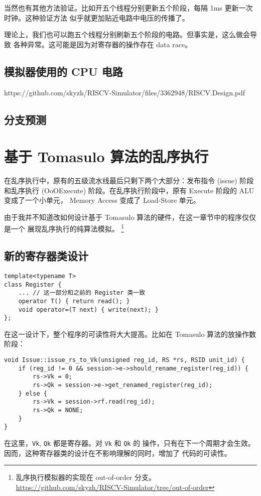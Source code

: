 \documentclass[12pt]{article}
\begin{document}
    当然也有其他方法验证。比如开五个线程分别更新五个阶段，每隔 1ms 更新一次时钟。这种验证方法
    似乎就更加贴近电路中电压的传播了。

    \begin{tcolorbox}
        理论上，我们也可以跑五个线程分别刷新五个阶段的电路。但事实是，这么做会导致
        各种异常。这可能是因为对寄存器的操作存在 data race。
    \end{tcolorbox}

    \subsection{模拟器使用的 CPU 电路}
    https://github.com/skyzh/RISCV-Simulator/files/3362948/RISCV.Design.pdf
    
    \subsection{分支预测}

    \section{基于 Tomasulo 算法的乱序执行}\label{out_of_order_execution}

    在乱序执行中，原有的五级流水线最后只剩下两个大部分：发布指令 (issue) 阶段和乱序执行
    (OoOExecute) 阶段。在乱序执行阶段中，原有 Execute 阶段的 ALU 变成了一个小单元，
    Memory Access 变成了 Load-Store 单元。

    由于我并不知道改如何设计基于 Tomasulo 算法的硬件，在这一章节中的程序仅仅是一个
    展现乱序执行的纯算法模拟。
    \footnote{乱序执行模拟器的实现在 out-of-order 分支。
        \url{https://github.com/skyzh/RISCV-Simulator/tree/out-of-order}}

    \subsection{新的寄存器类设计}\label{new_register_design}

    \begin{verbatim}
template<typename T>
class Register {
    ... // 这一部分和之前的 Register 类一致
    operator T() { return read(); }
    void operator=(T next) { write(next); }
};
    \end{verbatim}

    在这一设计下，整个程序的可读性将大大提高。比如在 Tomasulo 算法的放操作数阶段：

    \begin{verbatim}
void Issue::issue_rs_to_Vk(unsigned reg_id, RS *rs, RSID unit_id) {
    if (reg_id != 0 && session->e->should_rename_register(reg_id)) {
        rs->Vk = 0;
        rs->Qk = session->e->get_renamed_register(reg_id);
    } else {
        rs->Vk = session->rf.read(reg_id);
        rs->Qk = NONE;
    }
}
    \end{verbatim}

    在这里，\texttt{Vk}, \texttt{Qk} 都是寄存器。对 \texttt{Vk} 和 \texttt{Qk} 的
    操作，只有在下一个周期才会生效。因而，这种寄存器类的设计在不影响理解的同时，增加了
    代码的可读性。
\end{document}
